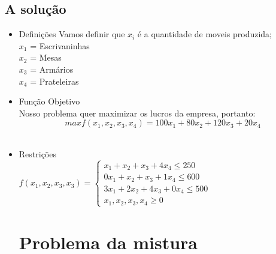 \documentclass[a4paper]{article}
\begin{document}
\subsection{A solu\c{c}\~ao}
\begin{itemize}
\item Defini\c{c}\~oes
Vamos definir que $x_i$ \'e a quantidade de moveis produzida;
\\
$x_1$ = Escrivaninhas
\\
$x_2$ = Mesas 
\\
$x_3$ = Arm\'arios
\\
$x_4$ = Prateleiras
\\
\item Fun\c{c}\~ao Objetivo
\\
Nosso problema quer maximizar os lucros da empresa, portanto:
\\
\begin{equation}
max f(x_1,x_2,x_3,x_4) = 100x_1 + 80x_2 +120 x_3 + 20 x_4
\end{equation}
\\
\item Restri\c{c}\~oes
\\
$f(x_1,x_2,x_3,x_3) = 
\left \{
\begin{array}{ll}
x_1 + x_2 + x_3 +4x_4 \leq 250 \\ 
0x_1 + x_2 + x_3 +1x_4  \leq 600\\ 
3x_1 + 2x_2 + 4x_3 +0x_4  \leq 500\\ 
x_1,x_2,x_3, x_4 \geq 0
\end{array}$
\section{Problema da mistura}

\end{itemize}
\end{document}
